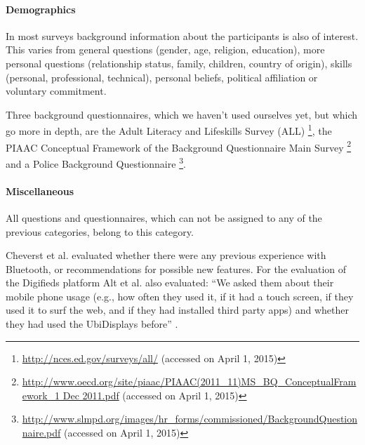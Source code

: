 	\paragraph{Demographics}

		In most surveys background information about the participants is also of interest. This varies from general questions (gender, age, religion, education), more personal questions (relationship status, family, children, country of origin), skills (personal, professional, technical), personal beliefs, political affiliation or voluntary commitment.

		Three background questionnaires, which we haven't used ourselves yet, but which go more in depth, are the Adult Literacy and Lifeskills Survey (ALL) \footnote{\url{http://nces.ed.gov/surveys/all/} (accessed on April 1, 2015)}, the PIAAC Conceptual Framework of the Background Questionnaire Main Survey \footnote{\url{http://www.oecd.org/site/piaac/PIAAC(2011_11)MS_BQ_ConceptualFramework_1 Dec 2011.pdf} (accessed on April 1, 2015)} and a Police Background Questionnaire \footnote{\url{http://www.slmpd.org/images/hr_forms/commissioned/BackgroundQuestionnaire.pdf} (accessed on April 1, 2015)}.



	\paragraph{Miscellaneous}

		All questions and questionnaires, which can not be assigned to any of the previous categories, belong to this category. 

		Cheverst et al. \cite{cheverst2005hermes} evaluated whether there were any previous experience with Bluetooth, or recommendations for possible new features.
		For the evaluation of the Digifieds platform Alt et al. also evaluated: ``We asked them about their mobile phone usage (e.g., how often they used it, if it had a touch screen, if they used it to surf the web, and if they had installed third party apps) and whether they had used the UbiDisplays before'' \cite{alt2011digifieds}.








	\label{table:standardized-questionnaires}


